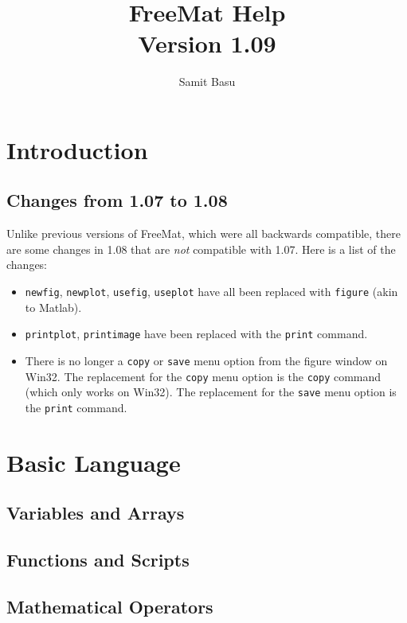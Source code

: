 \documentclass{book}
\title{FreeMat Help\\Version 1.09}
\author{Samit Basu}
\begin{document}
\maketitle
\tableofcontents
\chapter{Introduction}
\section{Changes from 1.07 to 1.08}
Unlike previous versions of FreeMat, which were all backwards compatible, there are some changes in 1.08 that are \emph{not} compatible with 1.07.  Here is a list of the changes:
\begin{itemize}
\item \verb|newfig|, \verb|newplot|, \verb|usefig|, \verb|useplot| have all been replaced with \verb|figure| (akin to Matlab).
\item \verb|printplot|, \verb|printimage| have been replaced with the \verb|print| command.
\item There is no longer a \verb|copy| or \verb|save| menu option from the figure window on Win32.  The replacement for the \verb|copy| menu option is the \verb|copy| command (which only works on Win32).  The replacement for the \verb|save| menu option  is the \verb|print| command.
\end{itemize}
\chapter{Basic Language}
\section{Variables and Arrays}






\section{Functions and Scripts}








\section{Mathematical Operators}















\end{document}
